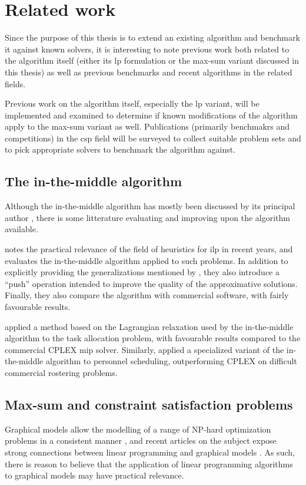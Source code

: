 \section{Related work}
Since the purpose of this thesis is to extend an existing algorithm and benchmark it against known solvers, it is interesting to note previous work both related to the algorithm itself (either its \gls{lp} formulation or the max-sum variant discussed in this thesis) as well as previous benchmarks and recent algorithms in the related fields.

Previous work on the algorithm itself, especially the \gls{lp} variant, will be implemented and examined to determine if known modifications of the algorithm apply to the max-sum variant as well.
Publications (primarily benchmakrs and competitions) in the \gls{csp} field will be surveyed to collect suitable problem sets and to pick appropriate solvers to benchmark the algorithm against.

\subsection{The in-the-middle algorithm}
Although the in-the-middle algorithm has mostly been discussed by its principal author \parencites{Wedelin95}{Wedelin08}{Wedelin13}{Alefragis00}, there is some litterature evaluating and improving upon the algorithm available.

\Textcite{Bastert10} notes the practical relevance of the field of heuristics for \gls{ilp} in recent years, and evaluates the in-the-middle algorithm applied to such problems. In addition to explicitly providing the generalizations mentioned by \textcite{Wedelin95}, they also introduce a \enquote{push} operation intended to improve the quality of the approximative solutions. Finally, they also compare the algorithm with commercial software, with fairly favourable results.

\Textcite{Ernst05} applied a method based on the Lagrangian relaxation used by the in-the-middle algorithm to the task allocation problem, with favourable results compared to the commercial CPLEX \gls{mip} solver.
Similarly, \textcite{Mason01} applied a specialized variant of the in-the-middle algorithm to personnel scheduling, outperforming CPLEX on difficult commercial rostering problems.

\subsection{Max-sum and constraint satisfaction problems}
Graphical models allow the modelling of a range of NP-hard optimization problems in a consistent manner \parencite{deGivry14}, and recent articles on the subject expose strong connections between linear programming and graphical models \parencites{Werner07}{Kolmogorov13}.
As such, there is reason to believe that the application of linear programming algorithms to graphical models may have practical relevance.

